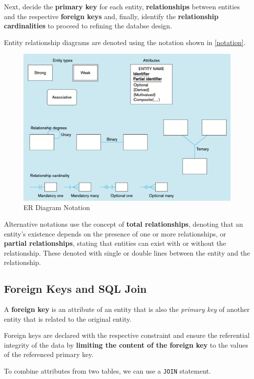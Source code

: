 Next, decide the \textbf{primary key} for each entity, \textbf{relationships} between entities and the respective \textbf{foreign keys} and, finally, identify the \textbf{relationship cardinalities} to proceed to refining the databse design.  

Entity relationship diagrams are denoted using the notation shown in \autoref{notation}.

\begin{figure}[H]
	\centering
	\includegraphics[width=\textwidth]{notation.png}
	\caption{ER Diagram Notation}
	\label{notation}
\end{figure}

Alternative notations use the concept of \textbf{total relationships}, denoting that an entity's existence depends on the presence of one or more relationships, or \textbf{partial relationships}, stating that entities can exist with or without the relationship. These denoted with single or double lines between the entity and the relationship.  

\subsection{Foreign Keys and SQL Join}
A \textbf{foreign key} is an attribute of an entity that is also the \emph{primary key} of another entity that is related to the original entity.

Foreign keys are declared with the respective constraint and ensure the referential integrity of the data by \textbf{limiting the content of the foreign key}  to the values of the referenced primary key.

To combine attributes from two tables, we can use a \texttt{JOIN} statement.

